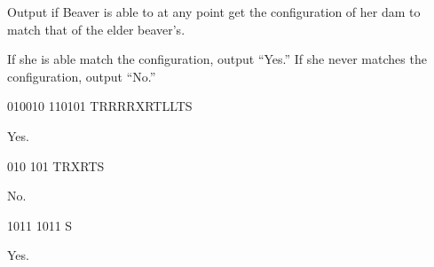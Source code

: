 \newpage

\begin{formalout}
Output if Beaver is able to at any point get the configuration of her dam to match that of the elder beaver's.

If she is able match the configuration, output ``Yes.''
If she never matches the configuration, output ``No.''
\end{formalout}

\begin{datain}
010010
110101
TRRRRXRTLLTS
\end{datain}
\begin{dataout}
Yes.
\end{dataout}

\begin{datain}
010
101
TRXRTS
\end{datain}
\begin{dataout}
No.
\end{dataout}

\begin{datain}
1011
1011
S
\end{datain}
\begin{dataout}
Yes.
\end{dataout}
